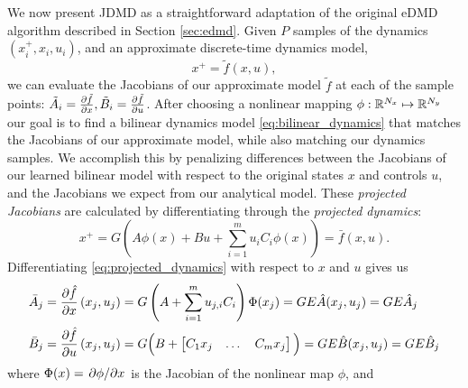 \documentclass{article}
\begin{document}
We now present JDMD as a straightforward adaptation of the original eDMD algorithm described
in Section \ref{sec:edmd}. Given $P$ samples of the dynamics $(x_i^+, x_i, u_i)$, and an
approximate discrete-time dynamics model,
\begin{equation}
  x^+ = \tilde{f}(x,u),
\end{equation}
we can evaluate the Jacobians of our approximate model $\tilde{f}$ at each of the sample
points: $\tilde{A}_i = \pdv{\tilde{f}}{x}, \tilde{B}_i = \pdv{\tilde{f}}{u}$. After
choosing a nonlinear mapping $\phi : \mathbb{R}^{N_x} \mapsto \mathbb{R}^{N_y}$ our goal is to find a
bilinear dynamics model \eqref{eq:bilinear_dynamics} that matches the Jacobians of our
approximate model, while also matching our dynamics samples. We accomplish this by 
penalizing differences between the Jacobians of our learned bilinear model with respect to 
the original states $x$ and controls $u$, and the Jacobians we expect from our analytical 
model. These \textit{projected Jacobians} are calculated by differentiating through the 
\textit{projected dynamics}:
\begin{equation} \label{eq:projected_dynamics}
  x^+ = G \left( A \phi(x) + B u + \sum_{i=1}^m u_i C_i \phi(x) \right)  = \bar{f}(x,u).
\end{equation}
Differentiating \eqref{eq:projected_dynamics} with respect to $x$ and $u$ gives us
\begin{subequations} \label{eq:projected_jacobians}
  \begin{align}
    \bar{A}_j &= \pdv{\hat{f}}{x}\left(x_j,u_j\right) 
    = G \left(A + \sum_{i=1}^m u_{j,i} C_i \right) \Phi(x_j)
    = G E \hat{A}(x_j,u_j) = G E \hat{A}_j \\
    \bar{B}_j &= \pdv{\hat{f}}{u}\left(x_j,u_j\right) 
    = G \Big(B + \begin{bmatrix} C_1 x_j & \dots & C_m x_j \end{bmatrix} \Big)
    = G E \hat{B}(x_j,u_j) = G E \hat{B}_j
  \end{align}
\end{subequations}
where $\Phi(x) = \pdv*{\phi}{x}$ is the Jacobian of the nonlinear map $\phi$, and
\end{document}
